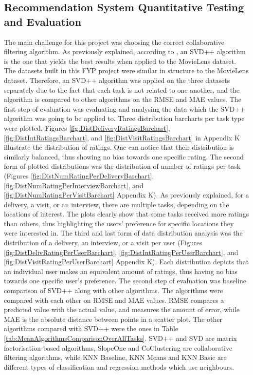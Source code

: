 \documentclass{aifyp}
\begin{document}
\subsection{Recommendation System Quantitative Testing and Evaluation}
\indent The main challenge for this project was choosing the correct collaborative filtering algorithm. As previously explained, according to \cite{CollaborativeComparison}, an SVD++ algorithm is the one that yields the best results when applied to the MovieLens dataset. The datasets built in this FYP project were similar in structure to the MovieLens dataset. Therefore, an SVD++ algorithm was applied on the three datasets separately due to the fact that each task is not related to one another, and the algorithm is compared to other algorithms on the RMSE and MAE values. 
\newline
\newline
\indent The first step of evaluation was evaluating and analysing the data which the SVD++ algorithm was going to be applied to. Three distribution barcharts per task type were plotted. Figures \ref{fig:DistDeliveryRatingsBarchart}, \ref{fig:DistIntRatingsBarchart}, and \ref{fig:DistVisitRatingsBarchart} in Appendix K illustrate the distribution of ratings. One can notice that their distribution is similarly balanced, thus showing no bias towards one specific rating. The second form of plotted distributions was the distribution of number of ratings per task (Figures \ref{fig:DistNumRatingPerDeliveryBarchart}, \ref{fig:DistNumRatingPerInterviewBarchart}, and \ref{fig:DistNumRatingPerVisitBarchart} Appendix K). As previously explained, for a delivery, a visit, or an interview, there are multiple tasks, depending on the locations of interest. The plots clearly show that some tasks received more ratings than others, thus highlighting the users' preference for specific locations they were interested in. The third and last form of data distribution analysis was the distribution of a delivery, an interview, or a visit per user (Figures \ref{fig:DistDelivRatingPerUserBarchart}, \ref{fig:DistIntRatingPerUserBarchart}, and \ref{fig:DistVisitRatingPerUserBarchart} Appendix K). Each distribution depicts that an individual user makes an equivalent amount of ratings, thus having no bias towards one specific user's preference.
\newline
\newline
\indent The second step of evaluation was baseline comparison of SVD++ along with other algorithms. The algorithms were compared with each other on RMSE and MAE values. RMSE compares a predicted value with the actual value, and measures the amount of error, while MAE is the absolute distance between points in a scatter plot. The other algorithms compared with SVD++ were the ones in Table \ref{tab:MeanAlgorithmsComparisonOverAllTasks}. SVD++ and SVD are matrix factorisation-based algorithms, SlopeOne and CoClustering are collaborative filtering algorithms, while KNN Baseline, KNN Means and KNN Basic are different types of classification and regression methods which use neighbours.
\end{document}
